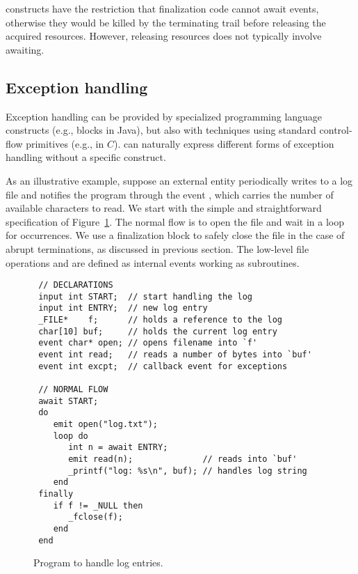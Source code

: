 
\DOFIN constructs have the restriction that finalization code cannot await 
events, otherwise they would be killed by the terminating trail before 
releasing the acquired resources.
However, releasing resources does not typically involve awaiting.

\subsection{Exception handling}
\label{sec.adv.excpt}

Exception handling can be provided by specialized programming language 
constructs (e.g.,  blocks in Java), but also with techniques 
using standard control-flow primitives (e.g.,  in $C$).
\CEU can naturally express different forms of exception handling without a 
specific construct.

As an illustrative example, suppose an external entity periodically writes to a 
log file and notifies the program through the event , which carries 
the number of available characters to read.
We start with the simple and straightforward specification of 
Figure~\ref{lst:excpt1}.
The normal flow is to open the file and wait in a loop for  
occurrences.
We use a finalization block to safely close the file in the case of abrupt 
terminations, as discussed in previous section.
The low-level file operations  and  are defined as 
internal events working as subroutines.

\begin{figure}[t]
{\small
\begin{verbatim}
 // DECLARATIONS
 input int START;  // start handling the log
 input int ENTRY;  // new log entry
 _FILE*    f;      // holds a reference to the log
 char[10] buf;     // holds the current log entry
 event char* open; // opens filename into `f'
 event int read;   // reads a number of bytes into `buf'
 event int excpt;  // callback event for exceptions

 // NORMAL FLOW
 await START;
 do
    emit open("log.txt");
    loop do
       int n = await ENTRY;
       emit read(n);              // reads into `buf'
       _printf("log: %s\n", buf); // handles log string
    end
 finally
    if f != _NULL then
       _fclose(f);
    end
 end
\end{verbatim}
}%
\caption{ Program to handle log entries.
\label{lst:excpt1}
}
\end{figure}

